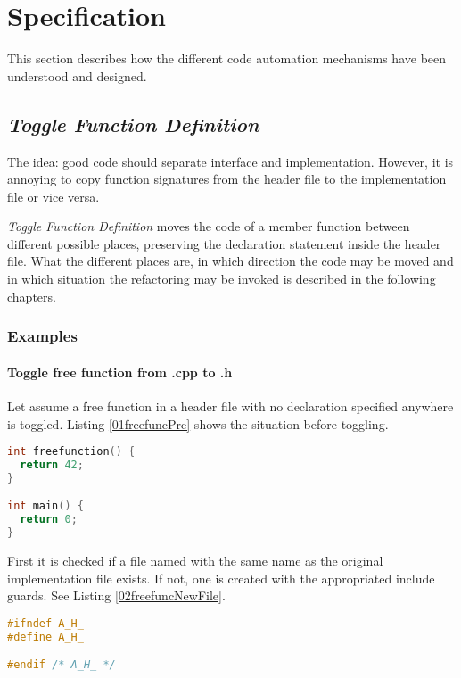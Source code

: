 \chapter{Specification}
\thispagestyle{fancy}

This section describes how the different code automation mechanisms have been
understood and designed.

\section{\textit{Toggle Function Definition}}

The idea: good code should separate interface and implementation. However, it is 
annoying to copy function signatures from the header file to the implementation 
file or vice versa. 

\textit{Toggle Function Definition} moves the code of a member function between 
different possible places, preserving the declaration statement inside the 
header file. What the different places are, in which direction the code may be 
moved and in which situation the refactoring may be invoked is described in the 
following chapters. 

\subsection{Examples}

\subsubsection{Toggle free function from .cpp to .h}
Let assume a free function in a header file with no declaration specified
anywhere is toggled. Listing \nolinebreak\ref{01freefuncPre} shows the
situation before toggling. 

\begin{lstlisting}[caption={A.cpp},label={01freefuncPre},language=C++]
int freefunction() {
  return 42;
}

int main() {
  return 0;
}
\end{lstlisting}

First it is checked if a file named with the same name as the original
implementation file exists. If not, one is created with the appropriated
include guards. See Listing \nolinebreak\ref{02freefuncNewFile}.

\begin{lstlisting}[caption={Newly createdA.h}, label={02freefuncNewFile},
language=C++]
#ifndef A_H_
#define A_H_

#endif /* A_H_ */
\end{lstlisting}

